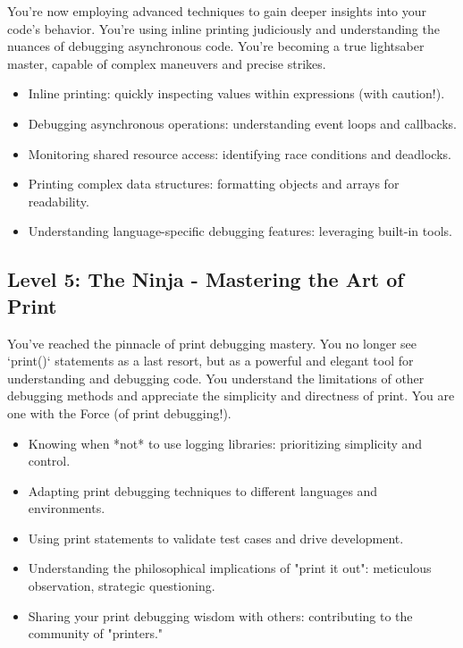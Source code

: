 \documentclass{article}
\begin{document}
{{{{You're now employing advanced techniques to gain deeper insights into your code's behavior. You're using inline printing judiciously and understanding the nuances of debugging asynchronous code. You're becoming a true lightsaber master, capable of complex maneuvers and precise strikes.

\begin{itemize}
    \item Inline printing:  quickly inspecting values within expressions (with caution!).
    \item Debugging asynchronous operations:  understanding event loops and callbacks.
    \item Monitoring shared resource access:  identifying race conditions and deadlocks.
    \item Printing complex data structures: formatting objects and arrays for readability.
    \item Understanding language-specific debugging features:  leveraging built-in tools.
\end{itemize}

\subsection*{Level 5: The Ninja - Mastering the Art of Print}

You've reached the pinnacle of print debugging mastery. You no longer see `print()` statements as a last resort, but as a powerful and elegant tool for understanding and debugging code. You understand the limitations of other debugging methods and appreciate the simplicity and directness of print. You are one with the Force (of print debugging!).

\begin{itemize}
    \item Knowing when *not* to use logging libraries:  prioritizing simplicity and control.
    \item Adapting print debugging techniques to different languages and environments.
    \item Using print statements to validate test cases and drive development.
    \item Understanding the philosophical implications of "print it out": meticulous observation, strategic questioning.
    \item Sharing your print debugging wisdom with others: contributing to the community of "printers."
\end{itemize}

}}}}
\end{document}
